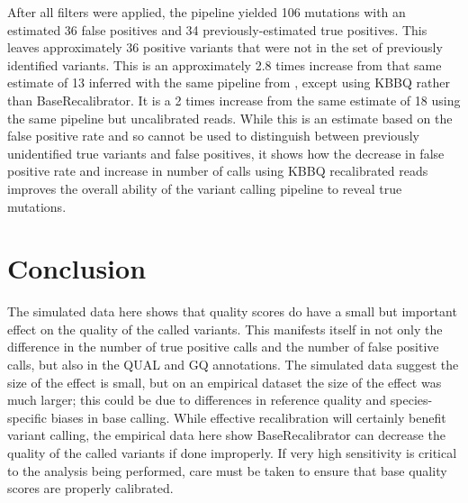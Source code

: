 After all filters were applied, the pipeline yielded 106 mutations with an estimated 36 false positives and 34 previously-estimated true positives. This leaves approximately 36 positive variants that were not in the set of previously identified variants. This is an approximately 2.8 times increase from that same estimate of 13 inferred with the same pipeline from \cite{orr_phylogenomic_2020}, except using KBBQ rather than BaseRecalibrator. It is a 2 times increase from the same estimate of 18 using the same pipeline but uncalibrated reads. While this is an estimate based on the false positive rate and so cannot be used to distinguish between previously unidentified true variants and false positives, it shows how the decrease in false positive rate and increase in number of calls using KBBQ recalibrated reads improves the overall ability of the variant calling pipeline to reveal true mutations.

\section{Conclusion}

The simulated data here shows that quality scores do have a small but important effect on the quality of the called variants. This manifests itself in not only the difference in the number of true positive calls and the number of false positive calls, but also in the QUAL and GQ annotations. The simulated data suggest the size of the effect is small, but on an empirical dataset the size of the effect was much larger; this could be due to differences in reference quality and species-specific biases in base calling. While effective recalibration will certainly benefit variant calling, the empirical data here show BaseRecalibrator can decrease the quality of the called variants if done improperly. If very high sensitivity is critical to the analysis being performed, care must be taken to ensure that base quality scores are properly calibrated.

\printbibliography[segment=\therefsegment]{}
